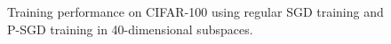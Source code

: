 \documentclass[11pt, a4paper]{article}
\begin{document}
\begin{figure}[!h]
\caption{\centering Training performance on CIFAR-100 using regular SGD training and P-SGD training in 40-dimensional subspaces.}
\label{fig:exp1-app}
\end{figure}
\end{document}
